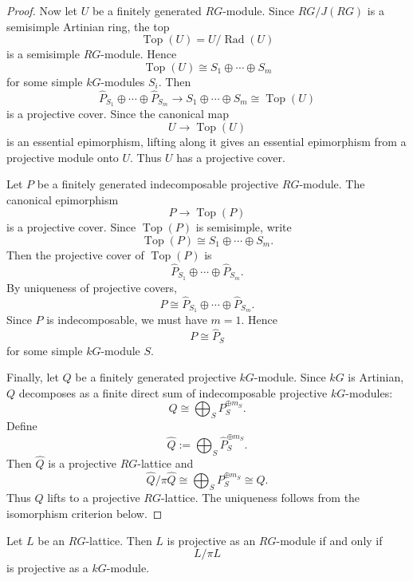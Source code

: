 \begin{proof}
    Now let \(U\) be a finitely generated \(RG\)-module. Since \(RG/J(RG)\) is a
    semisimple Artinian ring, the top
    \[
        \operatorname{Top}(U)=U/\operatorname{Rad}(U)
    \]
    is a semisimple \(RG\)-module. Hence
    \[
        \operatorname{Top}(U)
        \cong
        S_1\oplus\cdots\oplus S_m
    \]
    for some simple \(kG\)-modules \(S_i\). Then
    \[
        \widehat P_{S_1}\oplus\cdots\oplus \widehat P_{S_m}
        \longrightarrow
        S_1\oplus\cdots\oplus S_m
        \cong
        \operatorname{Top}(U)
    \]
    is a projective cover. Since the canonical map
    \[
        U\longrightarrow \operatorname{Top}(U)
    \]
    is an essential epimorphism, lifting along it gives an essential epimorphism from
    a projective module onto \(U\). Thus \(U\) has a projective cover.

    Let \(P\) be a finitely generated indecomposable projective \(RG\)-module. The
    canonical epimorphism
    \[
        P\longrightarrow \operatorname{Top}(P)
    \]
    is a projective cover. Since \(\operatorname{Top}(P)\) is semisimple, write
    \[
        \operatorname{Top}(P)\cong S_1\oplus\cdots\oplus S_m.
    \]
    Then the projective cover of \(\operatorname{Top}(P)\) is
    \[
        \widehat P_{S_1}\oplus\cdots\oplus \widehat P_{S_m}.
    \]
    By uniqueness of projective covers,
    \[
        P\cong \widehat P_{S_1}\oplus\cdots\oplus \widehat P_{S_m}.
    \]
    Since \(P\) is indecomposable, we must have \(m=1\). Hence
    \[
        P\cong \widehat P_S
    \]
    for some simple \(kG\)-module \(S\).

    Finally, let \(Q\) be a finitely generated projective \(kG\)-module. Since
    \(kG\) is Artinian, \(Q\) decomposes as a finite direct sum of indecomposable
    projective \(kG\)-modules:
    \[
        Q\cong \bigoplus_S P_S^{\oplus m_S}.
    \]
    Define
    \[
        \widehat Q:=\bigoplus_S \widehat P_S^{\oplus m_S}.
    \]
    Then \(\widehat Q\) is a projective \(RG\)-lattice and
    \[
        \widehat Q/\pi\widehat Q
        \cong
        \bigoplus_S P_S^{\oplus m_S}
        \cong
        Q.
    \]
    Thus \(Q\) lifts to a projective \(RG\)-lattice. The uniqueness follows from the
    isomorphism criterion below.
\end{proof}

\begin{corollary}
    Let \(L\) be an \(RG\)-lattice. Then \(L\) is projective as an \(RG\)-module if
    and only if
    \[
        L/\pi L
    \]
    is projective as a \(kG\)-module.
\end{corollary}

